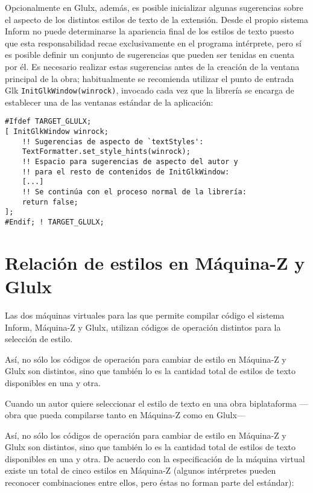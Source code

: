 \documentclass[a4paper,12pt]{article}
\numberwithin{equation}{section}
\begin{document}
Opcionalmente en Glulx, además, es posible inicializar algunas sugerencias sobre el aspecto de los distintos estilos de texto de la extensión. Desde el propio sistema Inform no puede determinarse la apariencia final de los estilos de texto puesto que esta responsabilidad recae exclusivamente en el programa intérprete, pero sí es posible definir un conjunto de sugerencias que pueden ser tenidas en cuenta por él. Es necesario realizar estas sugerencias antes de la creación de la ventana principal de la obra; habitualmente se recomienda utilizar el punto de entrada Glk \verb|InitGlkWindow(winrock)|, invocado cada vez que la librería se encarga de establecer una de las ventanas estándar de la aplicación\cite{PLO02}:

\begin{verbatim}
#Ifdef TARGET_GLULX;
[ InitGlkWindow winrock;
    !! Sugerencias de aspecto de `textStyles':
    TextFormatter.set_style_hints(winrock);
    !! Espacio para sugerencias de aspecto del autor y
    !! para el resto de contenidos de InitGlkWindow:
    [...]
    !! Se continúa con el proceso normal de la librería:
    return false;
];
#Endif; ! TARGET_GLULX;
\end{verbatim}


\section{Relación de estilos en Máquina-Z y Glulx}

Las dos máquinas virtuales para las que permite compilar código el sistema Inform, Máquina-Z y Glulx, utilizan códigos de operación distintos para la selección de estilo.

Así, no sólo los códigos de operación para cambiar de estilo en Máquina-Z y Glulx son distintos, sino que también lo es la cantidad total de estilos de texto disponibles en una y otra.

Cuando un autor quiere seleccionar el estilo de texto en una obra biplataforma ---obra que pueda compilarse tanto en Máquina-Z como en Glulx---





 Así, no sólo los códigos de operación para cambiar de estilo en Máquina-Z y Glulx son distintos, sino que también lo es la cantidad total de estilos de texto disponibles en una y otra. De acuerdo con la especificación de la máquina virtual existe un total de cinco estilos en Máquina-Z\cite{NF14} (algunos intérpretes pueden reconocer combinaciones entre ellos, pero éstas no forman parte del estándar):
\end{document}
